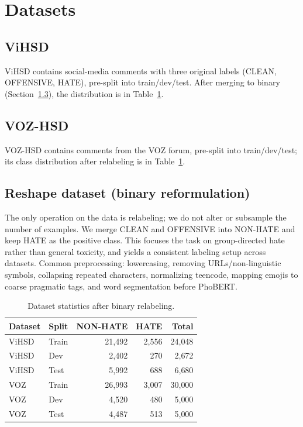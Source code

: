 \documentclass[11pt]{article}
\begin{document}
\section{Datasets}

\subsection{ViHSD}
ViHSD \citep{vihsd} contains social-media comments with three original labels (CLEAN, OFFENSIVE, HATE), pre-split into train/dev/test. After merging to binary (Section~\ref{sec:reshape}), the distribution is in Table~\ref{tab:data}.

\subsection{VOZ-HSD}
VOZ-HSD \citep{vozhsd} contains comments from the VOZ forum, pre-split into train/dev/test; its class distribution after relabeling is in Table~\ref{tab:data}.

\subsection{Reshape dataset (binary reformulation)}
\label{sec:reshape}
The only operation on the data is relabeling; we do not alter or subsample the number of examples. We merge CLEAN and OFFENSIVE into NON-HATE and keep HATE as the positive class. This focuses the task on group-directed hate rather than general toxicity, and yields a consistent labeling setup across datasets. Common preprocessing: lowercasing, removing URLs/non-linguistic symbols, collapsing repeated characters, normalizing teencode, mapping emojis to coarse pragmatic tags, and word segmentation before PhoBERT.

\begin{table}[t]
  \centering
  \small
  \begin{tabular}{llrrr}
    \toprule
    \textbf{Dataset} & \textbf{Split} & \textbf{NON-HATE} & \textbf{HATE} & \textbf{Total} \\
    \midrule
    ViHSD & Train & 21{,}492 & 2{,}556 & 24{,}048 \\
    ViHSD & Dev   & 2{,}402  & 270     & 2{,}672  \\
    ViHSD & Test  & 5{,}992  & 688     & 6{,}680  \\
    VOZ   & Train & 26{,}993 & 3{,}007 & 30{,}000 \\
    VOZ   & Dev   & 4{,}520  & 480     & 5{,}000  \\
    VOZ   & Test  & 4{,}487  & 513     & 5{,}000  \\
    \bottomrule
  \end{tabular}
  \caption{Dataset statistics after binary relabeling.}
  \label{tab:data}
\end{table}
\end{document}
